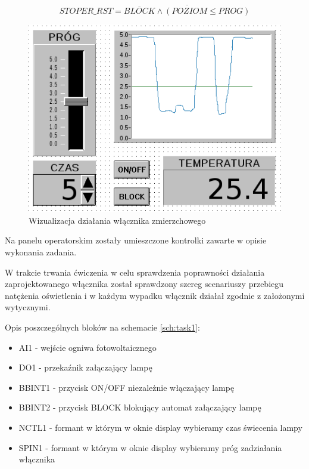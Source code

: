 \documentclass[12pt]{article}
\begin{document}
\begin{equation*}
	STOPER\_RST=\overline{\overline{BLOCK}\wedge (POZIOM\leq PROG)}
\end{equation*}

\newpage

\begin{figure}[!htb]
	\begin{center}
		\includegraphics[width=\linewidth]{../res/img/disp1.png}
	\end{center}
	\caption{Wizualizacja działania włącznika zmierzchowego}
\end{figure} 

Na panelu operatorskim zostały umieszczone kontrolki zawarte w opisie wykonania
zadania.

W trakcie trwania ćwiczenia w celu sprawdzenia poprawności działania
zaprojektowanego włącznika został sprawdzony szereg scenariuszy przebiegu
natężenia oświetlenia i w każdym wypadku włącznik działał zgodnie z założonymi
wytycznymi.

Opis poszczególnych bloków na schemacie \ref{sch:task1}:

\begin{itemize}
  \item AI1 - wejście ogniwa fotowoltaicznego
  \item DO1 - przekaźnik załączający lampę
  \item BBINT1 - przycisk ON/OFF niezależnie włączający lampę
  \item BBINT2 - przycisk BLOCK blokujący automat załączający lampę
  \item NCTL1 - formant w którym w oknie display wybieramy czas świecenia lampy
  \item SPIN1 - formant w którym w oknie display wybieramy próg zadziałania
  włącznika
\end{itemize}
\end{document}
